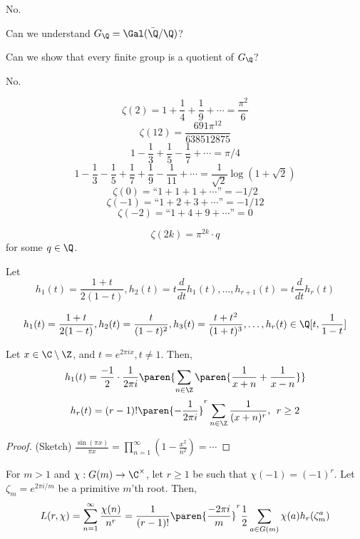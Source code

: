 \begin{notebox*}[Answer]
    No.
\end{notebox*}

\begin{notebox*}[Question]
    Can we understand $G_\Q = \Gal(\bar \Q / \Q)$?

    Can we show that every finite group is a quotient of $G_\Q$?
\end{notebox*}

\begin{notebox*}[Answer]
    No.
\end{notebox*}

\begin{prop}
    $$\zeta ( 2) = 1 +\frac{1}{4}+\frac{1}{9}+\cdots = \frac{\pi^2}{6}$$
    $$\zeta (12) = \frac{691\pi^{12}}{638512875}$$
    $$1 - \frac{1}{3}+\frac{1}{5}-\frac{1}{7}+\cdots = \pi /4$$
    $$1 - \frac{1}{3} - \frac{1}{5}+ \frac{1}{7}+\frac{1}{9}-\frac{1}{11}+\cdots = \frac{1}{\sqrt 2}\log ( 1 + \sqrt 2)$$
    $$\zeta ( 0) = \text{``}1 + 1 + 1+\cdots\text{''} = -1/2$$
    $$ \zeta (-1) = \text{``}1 + 2 + 3 +\cdots\text{''} = -1/12$$
    $$\zeta(-2)=\text{``}1+4+9+\cdots\text{''} =0 $$
\end{prop}

\begin{thm}
    $$\zeta (2k) = \pi^{2k}\cdot q$$
    for some $q \in \Q$.
\end{thm}

Let
$$h_1(t) = \frac{1+t}{2(1-t)}, h_2(t) = t \frac{d}{dt}h_1(t),\dots, h_{r+1}(t) =t\frac{d}{dt}h_r(t)$$

$$h_1(t) = \frac{1+t}{2(1-t)}, h_2(t) = \frac{t}{(1-t)^2},h_3(t) = \frac{t+t^2}{(1+t)^3},\dots ,h_r(t) \in \Q[t,\frac{1}{1-t}]$$

\begin{prop}
    Let $x \in \C \setminus \Z$, and $t= e^{2\pi i x},t\neq 1$. Then,
    \begin{equation}
        h_1(t) = \frac{-1}{2}\cdot \frac{1}{2\pi i}\paren{\sum_{n \in \Z}\paren{\frac{1}{x+n}+\frac{1}{x-n}}}
    \end{equation}
    \begin{equation}
        h_r(t) = (r-1)!\paren{-\frac{1}{2\pi i}}^r\sum_{n \in \Z}\frac{1}{(x+n)^r},\:\:r \geq 2
    \end{equation}
\end{prop}
\begin{proof}
    (Sketch) $\frac{\sin(\pi x)}{\pi x}=\prod_{n=1}^\infty (1-\frac{x^2}{n^2})=\cdots$
\end{proof}
\begin{cor}
    For $m>1$ and $\chi:G(m) \to \C^\times$, let $r\geq1$ be such that $\chi(-1)  = (-1)^r$. Let $\zeta_m=e^{2\pi i/m}$ be a primitive $m$'th root. Then,
    $$L(r,\chi)=\sum_{n=1}^\infty \frac{\chi(n)}{n^r}=\frac{1}{(r-1)!}\paren{\frac{-2\pi i}{m}}^r\frac{1}{2}\sum_{a \in G(m)}\chi (a)h_r(\zeta_m^a) $$
\end{cor}

